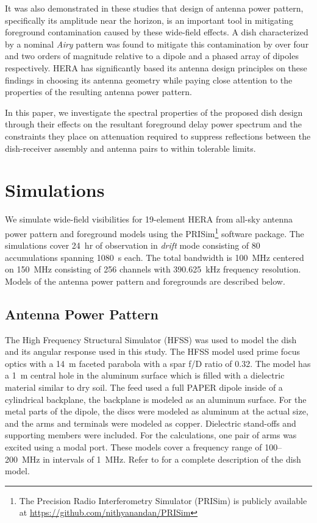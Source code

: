 \documentclass[preprint2,iop,numberedappendix,twocolappendix,appendixfloats]{emulateapj}
\begin{document}
It was also demonstrated in these studies that design of antenna power pattern, specifically its amplitude near the horizon, is an important tool in mitigating foreground contamination caused by these wide-field effects. A dish characterized by a nominal {\it Airy} pattern was found to mitigate this contamination by over four and two orders of magnitude relative to a dipole and a phased array of dipoles respectively. HERA has significantly based its antenna design principles on these findings in choosing its antenna geometry while paying close attention to the properties of the resulting antenna power pattern. 

In this paper, we investigate the spectral properties of the proposed dish design through their effects on the resultant foreground delay power spectrum and the constraints they place on attenuation required to suppress reflections between the dish-receiver assembly and antenna pairs to within tolerable limits. 

\section{Simulations}\label{sec:sim}

We simulate wide-field visibilities for 19-element HERA from all-sky antenna power pattern and foreground models using the PRISim\footnote{The Precision Radio Interferometry Simulator (PRISim) is publicly available at \url{https://github.com/nithyanandan/PRISim}} software package. The simulations cover 24~hr of observation in {\it drift} mode consisting of 80 accumulations spanning 1080~s each. The total bandwidth is 100~MHz centered on 150~MHz consisting of 256 channels with 390.625~kHz frequency resolution. Models of the antenna power pattern and foregrounds are described below.

\subsection{Antenna Power Pattern}\label{sec:beam-model}

The High Frequency Structural Simulator (HFSS) was used to model the dish and its angular response used in this study. The HFSS model used prime focus optics with a 14~m faceted parabola with a spar f/D ratio of 0.32.  The model has a 1~m central hole in the aluminum surface which is filled with a dielectric material similar to dry soil. The feed used a full PAPER dipole inside of a cylindrical backplane, the backplane is modeled as an aluminum surface. For the metal parts of the dipole, the discs were modeled as aluminum at the actual size, and the arms and terminals were modeled as copper. Dielectric stand-offs and supporting members were included. For the calculations, one pair of arms was excited using a modal port. These models cover a frequency range of 100--200~MHz in intervals of 1~MHz. Refer to \citet{deb16} for a complete description of the dish model. 
\end{document}
